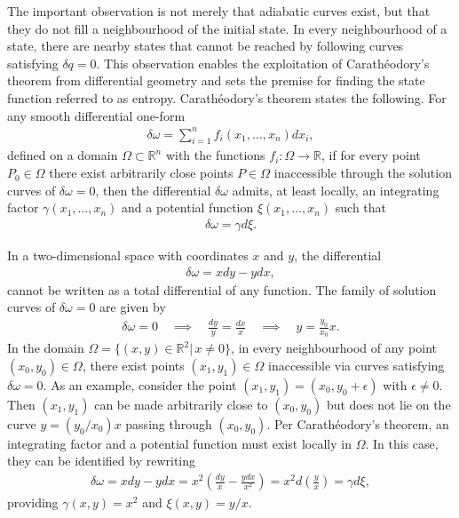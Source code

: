 The important observation is not merely that adiabatic curves exist, but that they
do not fill a neighbourhood of the initial state. In every neighbourhood of a state, there are nearby states that cannot be reached by following curves satisfying $\delta q=0$. This observation enables the exploitation of Carath\'eodory's theorem from differential geometry and sets the premise for finding the state function referred to as entropy. Carath\'eodory's theorem states the following. For any smooth differential one-form 
\begin{align}
    \delta \omega=\sum_{i=1}^nf_i(x_1,\ldots,x_n)dx_i,
\end{align}
defined on a domain $\Omega\subset\mathbb{R}^n$ with the functions $f_i:\Omega\to\mathbb{R}$, if for every point $P_0\in\Omega$ there exist arbitrarily close points $P\in\Omega$ inaccessible through the solution curves of $\delta \omega=0$, then the differential $\delta\omega$ admits, at least locally, an integrating factor $\gamma(x_1,\ldots,x_n)$ and a potential function $\xi(x_1,\ldots,x_n)$ such that
\begin{align}
    \delta \omega=\gamma d\xi.
\end{align}
\begin{example}
    In a two-dimensional space with coordinates $x$ and $y$, the differential 
    \begin{align*}
        \delta \omega=xdy-ydx,
    \end{align*}
    cannot be written as a total differential of any function. The family of solution curves of $\delta\omega=0$ are given by
    \begin{align*}
        \delta \omega=0 \quad \implies\quad \frac{dy}{y}=\frac{dx}{x} \quad \implies \quad y=\frac{y_0}{x_0}x.
    \end{align*}
    In the domain $\Omega=\{(x,y)\in\mathbb{R}^2|\,x\neq 0\}$, in every neighbourhood of any point $(x_0,y_0)\in\Omega$, there exist points $(x_1,y_1)\in\Omega$ inaccessible via curves satisfying $\delta\omega=0$. As an example, consider the point $(x_1,y_1)=(x_0,y_0+\epsilon)$ with $\epsilon\neq 0$. Then $(x_1,y_1)$ can be made arbitrarily close to $(x_0,y_0)$ but does not lie on the curve $y=(y_0/x_0)x$ passing through $(x_0,y_0)$. Per Carath\'eodory's theorem, an integrating factor and a potential function must exist locally in $\Omega$. In this case, they can be identified by rewriting
    \begin{align*}
        \delta \omega=xdy-ydx=x^2\left(\frac{dy}{x}-\frac{ydx}{x^2}\right)=x^2 d\left(\frac{y}{x}\right)=\gamma d\xi,
    \end{align*}
    providing $\gamma(x,y)=x^2$ and $\xi(x,y)=y/x$.
\end{example}

